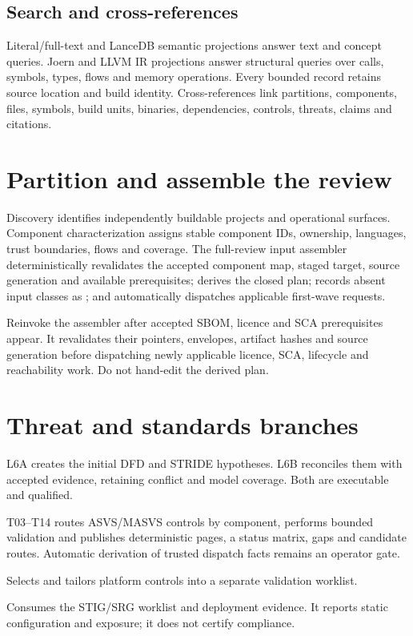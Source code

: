 \documentclass[10pt,a4paper]{article}
\begin{document}
\subsection{Search and cross-references}
Literal/full-text and LanceDB semantic projections answer text and concept queries. Joern and LLVM
IR projections answer structural queries over calls, symbols, types, flows and memory operations.
Every bounded record retains source location and build identity. Cross-references link partitions,
components, files, symbols, build units, binaries, dependencies, controls, threats, claims and
citations.

\section{Partition and assemble the review}
Discovery identifies independently buildable projects and operational surfaces. Component
characterization assigns stable component IDs, ownership, languages, trust boundaries, flows and
coverage. The full-review input assembler deterministically revalidates the accepted component map,
staged target, source generation and available prerequisites; derives the closed plan; records absent
input classes as ; and automatically dispatches applicable first-wave requests.

Reinvoke the assembler after accepted SBOM, licence and SCA prerequisites appear. It revalidates
their pointers, envelopes, artifact hashes and source generation before dispatching newly applicable
licence, SCA, lifecycle and reachability work. Do not hand-edit the derived plan.

\section{Threat and standards branches}
\begin{description}[style=nextline,font=\sffamily\bfseries]
\item[L6A and L6B threat model] L6A creates the initial DFD and STRIDE hypotheses. L6B reconciles
them with accepted evidence, retaining conflict and model coverage. Both are executable and qualified.
\item[OWASP] T03--T14 routes ASVS/MASVS controls by component, performs bounded validation and
publishes deterministic pages, a status matrix, gaps and candidate routes. Automatic derivation of
trusted dispatch facts remains an operator gate.
\item[STIG/SRG] Selects and tailors platform controls into a separate validation worklist.
\item[Deployment hardening] Consumes the STIG/SRG worklist and deployment evidence. It reports
static configuration and exposure; it does not certify compliance.
\end{description}
\end{document}

